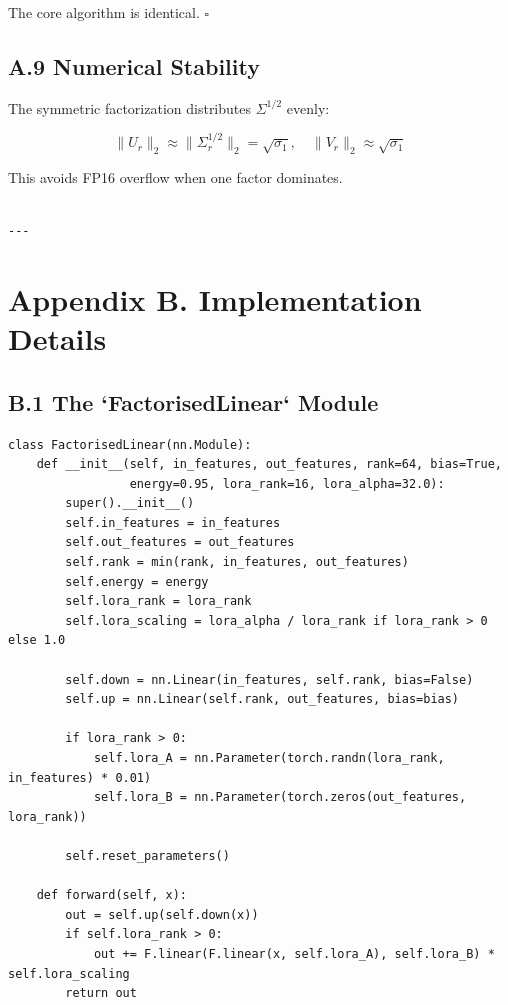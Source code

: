 The core algorithm is identical. $\square$

\subsection{A.9 Numerical Stability}

The symmetric factorization distributes $\Sigma^{1/2}$ evenly:

\[
\|U_r\|_2 \approx \|\Sigma_r^{1/2}\|_2 = \sqrt{\sigma_1}, \quad
\|V_r\|_2 \approx \sqrt{\sigma_1}
\tag{A.5}
\]

This avoids FP16 overflow when one factor dominates.
\begin{lstlisting}

---
\end{lstlisting}


\section{Appendix B. Implementation Details}

\subsection{B.1 The `FactorisedLinear` Module}

\begin{lstlisting}
class FactorisedLinear(nn.Module):
    def __init__(self, in_features, out_features, rank=64, bias=True,
                 energy=0.95, lora_rank=16, lora_alpha=32.0):
        super().__init__()
        self.in_features = in_features
        self.out_features = out_features
        self.rank = min(rank, in_features, out_features)
        self.energy = energy
        self.lora_rank = lora_rank
        self.lora_scaling = lora_alpha / lora_rank if lora_rank > 0 else 1.0
        
        self.down = nn.Linear(in_features, self.rank, bias=False)
        self.up = nn.Linear(self.rank, out_features, bias=bias)
        
        if lora_rank > 0:
            self.lora_A = nn.Parameter(torch.randn(lora_rank, in_features) * 0.01)
            self.lora_B = nn.Parameter(torch.zeros(out_features, lora_rank))
        
        self.reset_parameters()
    
    def forward(self, x):
        out = self.up(self.down(x))
        if self.lora_rank > 0:
            out += F.linear(F.linear(x, self.lora_A), self.lora_B) * self.lora_scaling
        return out
\end{lstlisting}

